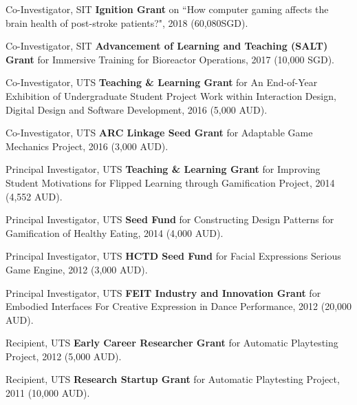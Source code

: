 \documentclass[10pt,a4paper]{article}
\renewenvironment{itemize}{
    \begin{list}{}{
            \setlength{\leftmargin}{1.5em}
            \setlength{\itemsep}{0.25em}
            \setlength{\parskip}{0pt}
            \setlength{\parsep}{0.25em}
        }
        }{
    \end{list}
}
\begin{document}
\begin{itemize}
    \item Co-Investigator, SIT \textbf{Ignition Grant} on ``How computer gaming affects the brain health of post-stroke patients?", 2018 (60,080SGD).

    \item Co-Investigator, SIT \textbf{Advancement of Learning and Teaching (SALT) Grant} for Immersive Training for Bioreactor Operations, 2017 (10,000 SGD).

    \item Co-Investigator, UTS \textbf{Teaching \& Learning Grant} for An End-of-Year Exhibition of Undergraduate Student Project Work within Interaction Design, Digital Design and Software Development, 2016 (5,000 AUD).

    \item Co-Investigator, UTS \textbf{ARC Linkage Seed Grant} for Adaptable Game Mechanics Project, 2016 (3,000 AUD).

    \item Principal Investigator, UTS \textbf{Teaching \& Learning Grant} for Improving Student Motivations for Flipped Learning through Gamification Project, 2014 (4,552 AUD).

    \item Principal Investigator, UTS \textbf{Seed Fund} for Constructing Design Patterns for Gamification of Healthy Eating, 2014 (4,000 AUD).

    \item Principal Investigator, UTS \textbf{HCTD Seed Fund} for Facial Expressions Serious Game Engine, 2012 (3,000 AUD).

    \item Principal Investigator, UTS \textbf{FEIT Industry and Innovation Grant} for Embodied Interfaces For Creative Expression in Dance Performance, 2012 (20,000 AUD).

    \item Recipient, UTS \textbf{Early Career Researcher Grant} for Automatic Playtesting Project, 2012 (5,000 AUD).

    \item Recipient, UTS \textbf{Research Startup Grant} for Automatic Playtesting Project, 2011 (10,000 AUD).

\end{itemize}


\nocite{*}
\end{document}
